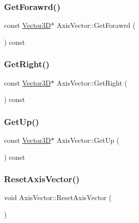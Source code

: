 \subsubsection{\texorpdfstring{Get\+Forawrd()}{GetForawrd()}}
{\footnotesize\ttfamily const \mbox{\hyperlink{class_vector3_d}{Vector3D}}$\ast$ Axis\+Vector\+::\+Get\+Forawrd (\begin{DoxyParamCaption}{ }\end{DoxyParamCaption}) const\hspace{0.3cm}{\ttfamily [inline]}}

\mbox{\label{class_axis_vector_a1d4f944d118d6f999c516dbdc0827a39}} 
\subsubsection{\texorpdfstring{Get\+Right()}{GetRight()}}
{\footnotesize\ttfamily const \mbox{\hyperlink{class_vector3_d}{Vector3D}}$\ast$ Axis\+Vector\+::\+Get\+Right (\begin{DoxyParamCaption}{ }\end{DoxyParamCaption}) const\hspace{0.3cm}{\ttfamily [inline]}}

\mbox{\label{class_axis_vector_aba45ae6f91ac516e6e42fdb8bcfcae2e}} 
\subsubsection{\texorpdfstring{Get\+Up()}{GetUp()}}
{\footnotesize\ttfamily const \mbox{\hyperlink{class_vector3_d}{Vector3D}}$\ast$ Axis\+Vector\+::\+Get\+Up (\begin{DoxyParamCaption}{ }\end{DoxyParamCaption}) const\hspace{0.3cm}{\ttfamily [inline]}}

\mbox{\label{class_axis_vector_a1414c1390a31d9e98c26d9803c61d2b8}} 
\subsubsection{\texorpdfstring{Reset\+Axis\+Vector()}{ResetAxisVector()}}
{\footnotesize\ttfamily void Axis\+Vector\+::\+Reset\+Axis\+Vector (\begin{DoxyParamCaption}{ }\end{DoxyParamCaption})}

